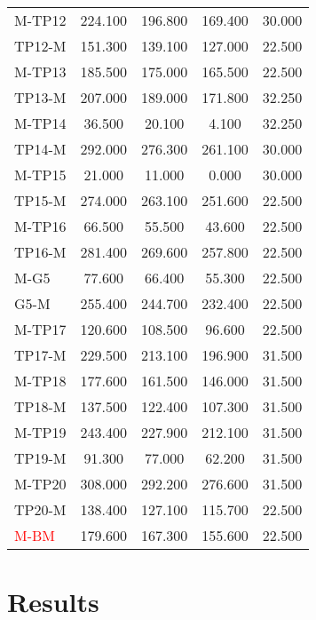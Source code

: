 \documentclass[12pt]{report}
\begin{document}
\begin{longtable}{lcccc}
M-TP12 & 224.100 & 196.800 & 169.400 & 30.000 \\
TP12-M & 151.300 & 139.100 & 127.000 & 22.500 \\
M-TP13 & 185.500 & 175.000 & 165.500 & 22.500 \\
TP13-M & 207.000 & 189.000 & 171.800 & 32.250 \\
M-TP14 & 36.500 & 20.100 & 4.100 & 32.250 \\
TP14-M & 292.000 & 276.300 & 261.100 & 30.000 \\
M-TP15 & 21.000 & 11.000 & 0.000 & 30.000 \\
TP15-M & 274.000 & 263.100 & 251.600 & 22.500 \\
M-TP16 & 66.500 & 55.500 & 43.600 & 22.500 \\
TP16-M & 281.400 & 269.600 & 257.800 & 22.500 \\
M-G5 & 77.600 & 66.400 & 55.300 & 22.500 \\
G5-M & 255.400 & 244.700 & 232.400 & 22.500 \\
M-TP17 & 120.600 & 108.500 & 96.600 & 22.500 \\
TP17-M & 229.500 & 213.100 & 196.900 & 31.500 \\
M-TP18 & 177.600 & 161.500 & 146.000 & 31.500 \\
TP18-M & 137.500 & 122.400 & 107.300 & 31.500 \\
M-TP19 & 243.400 & 227.900 & 212.100 & 31.500 \\
TP19-M & 91.300 & 77.000 & 62.200 & 31.500 \\
M-TP20 & 308.000 & 292.200 & 276.600 & 31.500 \\
TP20-M & 138.400 & 127.100 & 115.700 & 22.500 \\
\textcolor{red}{M-BM} & 179.600 & 167.300 & 155.600 & 22.500 \\
\bottomrule
\end{longtable}


\newpage
\section*{Results}
\end{document}
